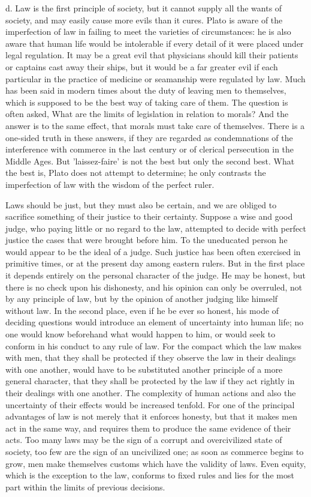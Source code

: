 \documentclass[11pt,letter]{article}
\begin{document}
\par  d. Law is the first principle of society, but it cannot supply all the wants of society, and may easily cause more evils than it cures. Plato is aware of the imperfection of law in failing to meet the varieties of circumstances: he is also aware that human life would be intolerable if every detail of it were placed under legal regulation. It may be a great evil that physicians should kill their patients or captains cast away their ships, but it would be a far greater evil if each particular in the practice of medicine or seamanship were regulated by law. Much has been said in modern times about the duty of leaving men to themselves, which is supposed to be the best way of taking care of them. The question is often asked, What are the limits of legislation in relation to morals? And the answer is to the same effect, that morals must take care of themselves. There is a one-sided truth in these answers, if they are regarded as condemnations of the interference with commerce in the last century or of clerical persecution in the Middle Ages. But 'laissez-faire' is not the best but only the second best. What the best is, Plato does not attempt to determine; he only contrasts the imperfection of law with the wisdom of the perfect ruler.

\par  Laws should be just, but they must also be certain, and we are obliged to sacrifice something of their justice to their certainty. Suppose a wise and good judge, who paying little or no regard to the law, attempted to decide with perfect justice the cases that were brought before him. To the uneducated person he would appear to be the ideal of a judge. Such justice has been often exercised in primitive times, or at the present day among eastern rulers. But in the first place it depends entirely on the personal character of the judge. He may be honest, but there is no check upon his dishonesty, and his opinion can only be overruled, not by any principle of law, but by the opinion of another judging like himself without law. In the second place, even if he be ever so honest, his mode of deciding questions would introduce an element of uncertainty into human life; no one would know beforehand what would happen to him, or would seek to conform in his conduct to any rule of law. For the compact which the law makes with men, that they shall be protected if they observe the law in their dealings with one another, would have to be substituted another principle of a more general character, that they shall be protected by the law if they act rightly in their dealings with one another. The complexity of human actions and also the uncertainty of their effects would be increased tenfold. For one of the principal advantages of law is not merely that it enforces honesty, but that it makes men act in the same way, and requires them to produce the same evidence of their acts. Too many laws may be the sign of a corrupt and overcivilized state of society, too few are the sign of an uncivilized one; as soon as commerce begins to grow, men make themselves customs which have the validity of laws. Even equity, which is the exception to the law, conforms to fixed rules and lies for the most part within the limits of previous decisions.
\end{document}

